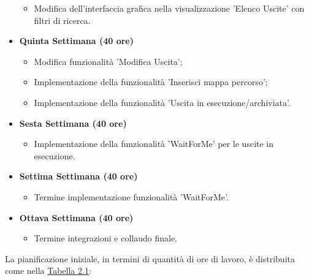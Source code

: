 \begin{itemize}
\begin{itemize}
		\item Modifica dell'interfaccia grafica nella visualizzazione 'Elenco Uscite' con filtri di ricerca.
	\end{itemize}
	\item \textbf{Quinta Settimana (40 ore)} 
	\begin{itemize}
		\item Modifica funzionalità 'Modifica Uscita';
		\item Implementazione della funzionalità 'Inserisci mappa percorso';
		\item Implementazione della funzionalità 'Uscita in esecuzione/archiviata'.
	\end{itemize}
	\item \textbf{Sesta Settimana (40 ore)} 
	\begin{itemize}
		\item Implementazione della funzionalità 'WaitForMe' per le uscite in esecuzione.
	\end{itemize}
	\item \textbf{Settima Settimana (40 ore)} 
	\begin{itemize}
		\item Termine implementazione funzionalità 'WaitForMe'.
	\end{itemize}
	\item \textbf{Ottava Settimana (40 ore)} 
	\begin{itemize}
		\item Termine integrazioni e collaudo finale.
	\end{itemize}
\end{itemize}

\newpage

\noindent La pianificazione iniziale, in termini di quantità di ore di lavoro, è distribuita come nella \hyperref[tab:Tabella riassuntiva della pianificazione iniziale di stage]{Tabella 2.1}:

